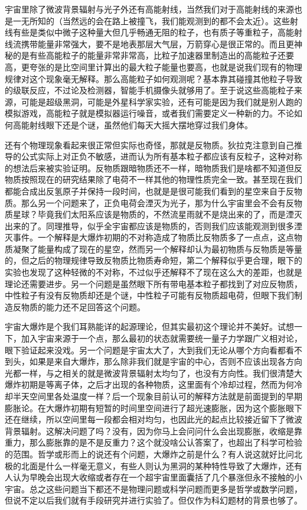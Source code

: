 \documentclass[
]{book}
\begin{document}
宇宙里除了微波背景辐射与光子外还有高能射线，当然我们对于高能射线的来源也是一无所知的（当然远的会在路上被撞飞，我们能观测到的都不会太近）。这些射线有些是类似中微子这种量大但几乎畅通无阻的粒子，也有质子等重粒子，高能射线流携带能量非常强大，要不是地表那层大气层，万箭穿心是很正常的。而且更神秘的是有些高能粒子的能量非常非常高，比粒子加速器里制造出的高能粒子还要高，更夸张的是比空间里计算出的最大粒子能量也要高，也就是说我们现有的物理规律对这个现象毫无解释。那么高能粒子如何观测呢？基本靠其碰撞其他粒子导致的级联反应，不过论及检测器，智能手机摄像头就够用了。至于说这些高能粒子来源，可能是超级黑洞，可能是外星科学家实验，还有可能是因为我们就是别人跑的模拟游戏，高能粒子就是模拟器运行噪音，或者我们需要定义一种新的力。不论如何高能射线眼下还是个谜，虽然他们每天大摇大摆地穿过我们身体。

还有个物理现象看起来很正常但实际也奇怪，那就是反物质。狄拉克注意到自己推导的公式实际上对正负不敏感，进而认为所有基本粒子都应该有反粒子，这种对称的想法后来被实验证明。反物质跟暗物质还不一样，暗物质我们是啥都不知道但反物质按照现在的研究结果除了电荷不一样其他的物理性质完全一致。甚至现在我们都能合成出反氢原子并保持一段时间，也就是是很可能我们看到的星空来自于反物质。那么另一个问题来了，正负电荷会湮灭为光子，那为什么宇宙里会不会有反物质星球？毕竟我们太阳系应该是物质的，不然流星雨就不是烧出来的了，而是湮灭出来的了。同理推导，似乎全宇宙都应该是物质的，否则我们应该能观测到很多湮灭事件。一个解释是大爆炸初期的不对称造成了物质比反物质多了一点点，这点物质凝聚了能量构成了现在的星空，然而另一个解释却认为最初物质与反物质是等量的，但之后的物理规律导致反物质比物质寿命短，第二个解释似乎更合理，眼下的实验也发现了这种轻微的不对称，不过似乎还解释不了现在这么大的差距，也就是理论还需要进步。另一个问题是虽然眼下所有带电基本粒子都找到了对应反物质，中性粒子有没有反物质却还是个谜，中性粒子可能有反物质超电荷，但眼下我们制造反物质的能力还不足回答这个问题。

宇宙大爆炸是个我们耳熟能详的起源理论，但其实最初这个理论并不美好。试想一下，加入宇宙来源于一个点，那么最初的状态就需要统一量子力学跟广义相对论，眼下验证起来没戏。另一个问题是宇宙太大了，大到我们无论从哪个方向看都看不到头，如果是来自大爆炸，那么除非我们就是宇宙的中心，否则不应该出现各方向光都一样，与之相关的就是微波背景辐射太均匀了，也没有方向性。我们很清楚大爆炸初期是等离子体，之后才出现的各种物质，这里面有个冷却过程，然而为何冷却半天空间里各处温度一样？后一个现象目前认可的解释方法就是前面提到的早期膨胀论。在大爆炸初期有短暂的时间里空间进行了超光速膨胀，因为这个膨胀眼下还在继续，所以空间里每一段都会相对均匀，也因此光的起点比较接近留下了微波背景辐射。这解决问题了吗？没有，因为你马上会问问什么会出现膨胀，收缩是靠重力，那么膨胀靠的是不是反重力？这个就没啥公认答案了，也超出了科学可检验的范围。哲学或形而上的说还有个问题，大爆炸之前是什么？有人说这就好比问北极的北面是什么一样毫无意义，有些人则认为黑洞的某种特性导致了大爆炸，还有人认为早晚会出现大收缩或者存在一个超宇宙里面囊括了几个暴涨但永不接触的小宇宙。总之这些问题当下都还不是物理问题或科学问题而更多是哲学或数学问题，但说不定以后我们就有手段研究并进行实验了。但仅作为科幻题材的背景也够了。
\end{document}
